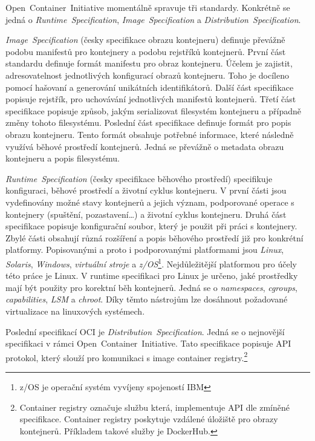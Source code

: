 Open~Container~Initiative momentálně spravuje tři standardy. Konkrétně se jedná o \textit{Runtime~Specification}, \textit{Image~Specification} a \textit{Distribution~Specification}. \cite{thelinuxfoundation_about}

\textit{Image~Specification} (česky specifikace obrazu kontejneru) definuje převážně podobu manifestů pro kontejnery a podobu rejstříků kontejnerů. První část standardu definuje formát manifestu pro obraz kontejneru. Účelem je zajistit, adresovatelnost jednotlivých konfigurací obrazů kontejneru. Toho je docíleno pomocí hašovaní a generování unikátních identifikátorů. Další část specifikace popisuje rejstřík, pro uchovávání jednotlivých manifestů kontejnerů. Třetí část specifikace popisuje způsob, jakým serializovat filesystém kontejneru a případně změny tohoto filesystému. Poslední část specifikace definuje formát pro popis obrazu kontejneru. Tento formát obsahuje potřebné informace, které následně využívá běhové prostředí kontejnerů. Jedná se převážně o metadata obrazu kontejneru a popis filesystému. \cite{opencontainerinitiative_2022_image}

\textit{Runtime~Specification} (česky specifikace běhového prostředí) specifikuje konfiguraci, běhové prostředí a životní cyklus kontejneru. V první části jsou vydefinovány možné stavy kontejnerů a jejich význam, podporované operace s kontejnery (spuštění, pozastavení\ldots) a životní cyklus kontejneru. Druhá část specifikace popisuje konfigurační soubor, který je použit při práci s kontejnery. Zbylé části obsahují různá rozšíření a popis běhového prostředí již pro konkrétní platformy. Popisovanými a proto i podporovanými platformami jsou \textit{Linux}, \textit{Solaris}, \textit{Windows}, \textit{virtuální stroje} a \textit{z/OS}\footnote{z/OS je operační systém vyvíjeny spojeností IBM}. Nejdůležitější platformou pro účely této práce je Linux. V runtime specifikaci pro Linux je určeno, jaké prostředky mají být použity pro korektní běh kontejnerů. Jedná se o \textit{namespaces}, \textit{cgroups}, \textit{capabilities}, \textit{LSM} a \textit{chroot}. Díky těmto nástrojům lze dosáhnout požadované virtualizace na linuxových systémech. \cite{opencontainerinitiative_2022_open}

Poslední specifikací OCI je \textit{Distribution~Specification}. Jedná se o nejnovější specifikaci v rámci Open~Container~Initiative. Tato specifikace popisuje API protokol, který slouží pro komunikaci s image container registry.\footnote{Container registry označuje službu která, implementuje API dle zmíněné specifikace. Container registry poskytuje vzdálené úložiště pro obrazy kontejnerů. Příkladem takové služby je DockerHub.} \cite{opencontainerinitiative_2022_distribution}

